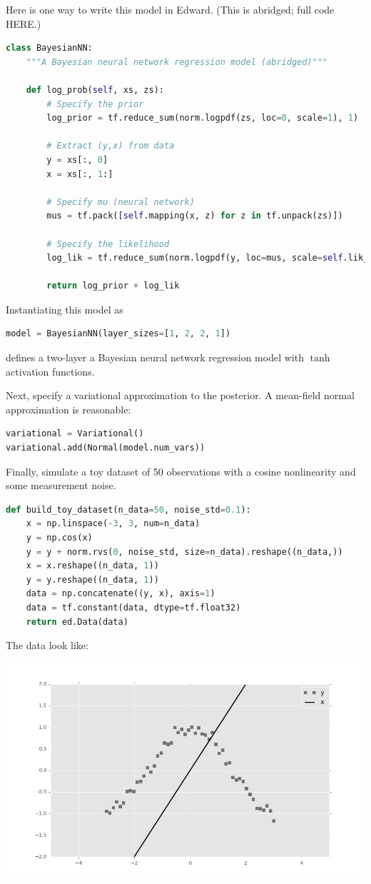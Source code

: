 Here is one way to write this model in Edward. (This is abridged;
full code HERE.)

\begin{lstlisting}[language=Python]
class BayesianNN:
    """A Bayesian neural network regression model (abridged)"""

    def log_prob(self, xs, zs):
        # Specify the prior
        log_prior = tf.reduce_sum(norm.logpdf(zs, loc=0, scale=1), 1)

        # Extract (y,x) from data
        y = xs[:, 0]
        x = xs[:, 1:]

        # Specify mu (neural network)
        mus = tf.pack([self.mapping(x, z) for z in tf.unpack(zs)])

        # Specify the likelihood
        log_lik = tf.reduce_sum(norm.logpdf(y, loc=mus, scale=self.lik_variance), 1)

        return log_prior + log_lik
\end{lstlisting}

Instantiating this model as 
\begin{lstlisting}[language=Python]
model = BayesianNN(layer_sizes=[1, 2, 2, 1])
\end{lstlisting}
defines a two-layer a Bayesian neural network regression model with $\tanh$
activation functions.

Next, specify a variational approximation to the posterior. A mean-field normal
approximation is reasonable:
\begin{lstlisting}[language=Python]
variational = Variational()
variational.add(Normal(model.num_vars))  
\end{lstlisting}

Finally, simulate a toy dataset of 50 observations with a cosine nonlinearity
and some measurement noise.

\begin{lstlisting}[language=Python]
def build_toy_dataset(n_data=50, noise_std=0.1):
    x = np.linspace(-3, 3, num=n_data)
    y = np.cos(x) 
    y = y + norm.rvs(0, noise_std, size=n_data).reshape((n_data,))
    x = x.reshape((n_data, 1))
    y = y.reshape((n_data, 1))
    data = np.concatenate((y, x), axis=1)
    data = tf.constant(data, dtype=tf.float32)
    return ed.Data(data)  
\end{lstlisting}

The data look like:

\includegraphics[width=700px]{images/getting-started-fig0.png}

